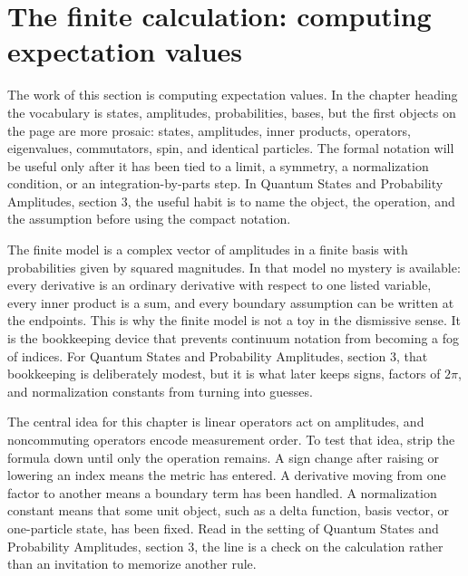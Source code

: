\section{The finite calculation: computing expectation values}













The work of this section is computing expectation values.  In the chapter heading the vocabulary is states, amplitudes, probabilities, bases, but the first objects on the page are more prosaic: states, amplitudes, inner products, operators, eigenvalues, commutators, spin, and identical particles.  The formal notation will be useful only after it has been tied to a limit, a symmetry, a normalization condition, or an integration-by-parts step.  In Quantum States and Probability Amplitudes, section 3, the useful habit is to name the object, the operation, and the assumption before using the compact notation.

The finite model is a complex vector of amplitudes in a finite basis with probabilities given by squared magnitudes.  In that model no mystery is available: every derivative is an ordinary derivative with respect to one listed variable, every inner product is a sum, and every boundary assumption can be written at the endpoints.  This is why the finite model is not a toy in the dismissive sense.  It is the bookkeeping device that prevents continuum notation from becoming a fog of indices.  For Quantum States and Probability Amplitudes, section 3, that bookkeeping is deliberately modest, but it is what later keeps signs, factors of \(2\pi\), and normalization constants from turning into guesses.

The central idea for this chapter is linear operators act on amplitudes, and noncommuting operators encode measurement order.  To test that idea, strip the formula down until only the operation remains.  A sign change after raising or lowering an index means the metric has entered.  A derivative moving from one factor to another means a boundary term has been handled.  A normalization constant means that some unit object, such as a delta function, basis vector, or one-particle state, has been fixed.  Read in the setting of Quantum States and Probability Amplitudes, section 3, the line is a check on the calculation rather than an invitation to memorize another rule.

